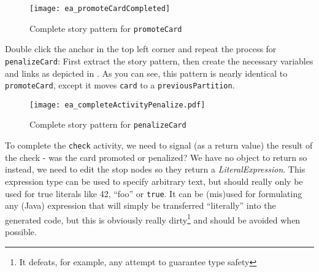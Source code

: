 \begin{stepbystep}
\begin{figure}[htbp]
\begin{center}
  \texttt{[image: ea\_promoteCardCompleted]}
  \caption{Complete story pattern for \texttt{promoteCard}}
  \label{ea:sdm_check_complete_activity_node}
\end{center}
\end{figure}

\clearpage

\item Double click the anchor in the top left corner and repeat the process for \texttt{penalizeCard}: First extract the story pattern,
then create the necessary variables and links as depicted in . As you can see, this pattern is nearly identical to
\texttt{promoteCard}, except it moves \texttt{card} to a \texttt{previousPartition}.

\vspace{0.5cm}

\begin{figure}[htbp]
\begin{center}
  \texttt{[image: ea\_completeActivityPenalize.pdf]}
  \caption{Complete story pattern for \texttt{penalizeCard}}
  \label{ea:sdm_check_complete_penalize}
\end{center}
\end{figure}


\vspace{0.5cm}

To complete the \texttt{check} activity, we need to signal (as a return value) the result of the check - was the card promoted or penalized? We have no object
to return so instead, we need to edit the stop nodes so they return a \emph{LiteralExpression}. This expression type can be used to
specify arbitrary text, but should really only be used for true literals like 42, ``foo'' or \texttt{true}. It can be (mis)used for formulating any (Java)
expression that will simply be transferred ``literally'' into the generated code, but this is obviously really dirty\footnote{It defeats, for example, any
attempt to guarantee type safety} and should be avoided when possible.

\vspace{0.5cm}


\end{stepbystep}
